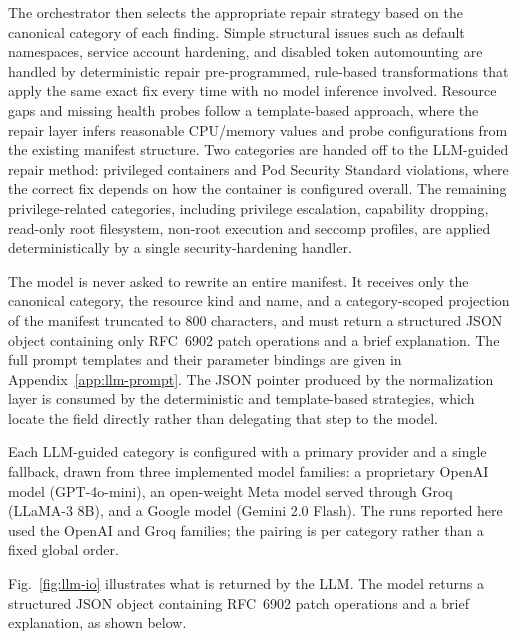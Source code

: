 \documentclass[preprint,12pt]{elsarticle}
\newcommand{\new}[1]{#1}
\newcommand{\fix}[1]{#1}
\begin{document}
\new{
The orchestrator then selects the appropriate repair strategy based 
on the canonical category of each finding. Simple structural issues 
such as default namespaces, service account hardening, and disabled 
token automounting are handled by deterministic repair 
pre-programmed, rule-based transformations that apply the same 
exact fix every time with no model inference involved. Resource 
gaps and missing health probes follow a template-based approach, 
where the repair layer infers reasonable CPU/memory values and 
probe configurations from the existing manifest structure. Two categories are handed off to the LLM-guided repair method: privileged
containers and Pod Security Standard violations, where the correct fix depends
on how the container is configured overall. The remaining privilege-related
categories, including privilege escalation, capability dropping, read-only root
filesystem, non-root execution and seccomp profiles, are applied
deterministically by a single security-hardening handler.}

\new{The model is never asked to rewrite an entire manifest. It receives 
only the canonical category, the resource kind and name, and a 
category-scoped projection of the manifest truncated to 800 characters, 
and must return a structured JSON object containing only RFC~6902 patch 
operations and a brief explanation. The full prompt templates and their 
parameter bindings are given in Appendix~\ref{app:llm-prompt}. The JSON 
pointer produced by the normalization layer is consumed by the 
deterministic and template-based strategies, which locate the field 
directly rather than delegating that step to the model.}

\fix{Each LLM-guided category is configured with a primary provider and a
single fallback, drawn from three implemented model families: a proprietary
OpenAI model (GPT-4o-mini), an open-weight Meta model served through Groq
(LLaMA-3 8B), and a Google model (Gemini 2.0 Flash). The runs reported here
used the OpenAI and Groq families; the pairing is per category rather than a
fixed global order.}

\new{Fig.~\ref{fig:llm-io} illustrates what is returned by the LLM. The model returns a structured JSON object containing RFC~6902 patch operations 
and a brief explanation, as shown below.}
\end{document}
